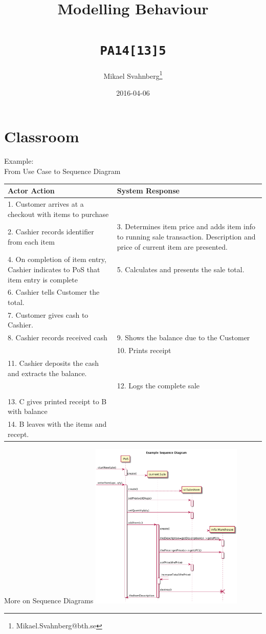 \documentclass[10pt,t,a4paper]{beamer}
\author{Mikael Svahnberg\thanks{Mikael.Svahnberg@bth.se}}
\date{2016-04-06}
\title{Modelling Behaviour \\\\ \texttt{PA14[13]5}}
\begin{document}
\maketitle

\section{Classroom}
\label{sec-1}
\begin{frame}[shrink=25,label=sec-1-1]{Example: \\ From Use Case to Sequence Diagram}
\begin{center}
\begin{tabular}{p{7cm}p{7cm}}
Actor Action & System Response\\
\hline
1. Customer arrives at a checkout with items to purchase & \\
2. Cashier records identifier from each item & 3. Determines item price and adds item info to running sale transaction. Description and price of current item are presented.\\
4. On completion of item entry, Cashier indicates to PoS that item entry is complete & 5. Calculates and presents the sale total.\\
6. Cashier tells Customer the total. & \\
7. Customer gives cash to Cashier. & \\
8. Cashier records received cash & 9. Shows the balance due to the Customer\\
 & 10. Prints receipt\\
11. Cashier deposits the cash and extracts the balance. & \\
 & 12. Logs the complete sale\\
 & \\
13. C gives printed receipt to B with balance & \\
14. B leaves with the items and recept. & \\
\hline
\end{tabular}
\end{center}
\end{frame}
\begin{frame}[label=sec-1-2]{More on Sequence Diagrams}
\vspace{-1cm}\hspace{2cm}
\includegraphics[height=8cm]{FSequenceDiagrams.png}
\end{frame}
\end{document}
